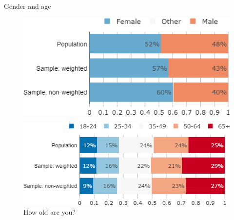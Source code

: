 \begin{framefont}{\small}
\begin{frame}{Gender and age}%
\begin{figure}[h!]
\centering
\caption{What is your gender?}
\includegraphics[width=.43\paperwidth]{../figures/FR/gender_FR_comp.png} \\
\centering
\caption{How old are you?}
\includegraphics[width=.43\paperwidth]{../figures/FR/age_FR_comp.png}
\end{figure}
\end{frame}


\end{framefont}
